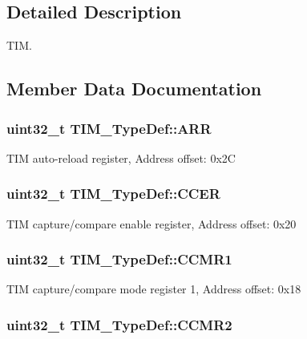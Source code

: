 \subsection{Detailed Description}
T\-I\-M. 

\subsection{Member Data Documentation}
\hypertarget{struct_t_i_m___type_def_a6a42766a6ca3c7fe10a810ebd6b9d627}{
\subsubsection[{A\-R\-R}]{ uint32\-\_\-t T\-I\-M\-\_\-\-Type\-Def\-::\-A\-R\-R}}\label{struct_t_i_m___type_def_a6a42766a6ca3c7fe10a810ebd6b9d627}
T\-I\-M auto-\/reload register, Address offset\-: 0x2\-C \hypertarget{struct_t_i_m___type_def_ad7271cc1eec9ef16e4ee5401626c0b3b}{
\subsubsection[{C\-C\-E\-R}]{ uint32\-\_\-t T\-I\-M\-\_\-\-Type\-Def\-::\-C\-C\-E\-R}}\label{struct_t_i_m___type_def_ad7271cc1eec9ef16e4ee5401626c0b3b}
T\-I\-M capture/compare enable register, Address offset\-: 0x20 \hypertarget{struct_t_i_m___type_def_a0f2291e7efdf3222689ef13e9be2ea4a}{
\subsubsection[{C\-C\-M\-R1}]{ uint32\-\_\-t T\-I\-M\-\_\-\-Type\-Def\-::\-C\-C\-M\-R1}}\label{struct_t_i_m___type_def_a0f2291e7efdf3222689ef13e9be2ea4a}
T\-I\-M capture/compare mode register 1, Address offset\-: 0x18 \hypertarget{struct_t_i_m___type_def_aa8129ca70a2232c91c8cfcaf375249f6}{
\subsubsection[{C\-C\-M\-R2}]{ uint32\-\_\-t T\-I\-M\-\_\-\-Type\-Def\-::\-C\-C\-M\-R2}}\label{struct_t_i_m___type_def_aa8129ca70a2232c91c8cfcaf375249f6}
